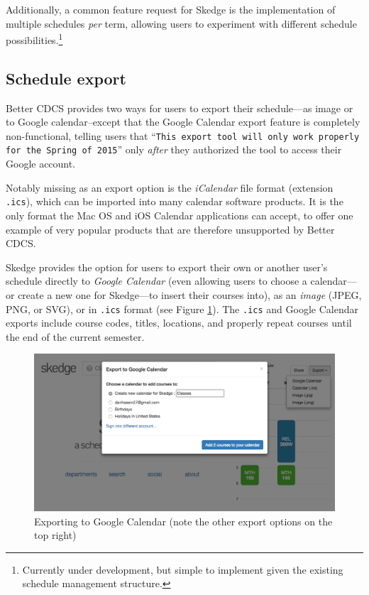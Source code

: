 Additionally, a common feature request for Skedge is the implementation of multiple schedules \emph{per} term, allowing users to experiment with different schedule possibilities.\footnote{Currently under development, but simple to implement given the existing schedule management structure.}

\subsection{Schedule export}

Better CDCS provides two ways for users to export their schedule---as image or to Google calendar--except that the Google Calendar export feature is completely non-functional, telling users that ``{\tt This export tool will only work properly for the Spring of 2015}'' only \emph{after} they authorized the tool to access their Google account.

Notably missing as an export option is the \emph{iCalendar} file format (extension {\tt .ics}), which can be imported into many calendar software products. It is the only format the Mac OS and iOS Calendar applications can accept, to offer one example of very popular products that are therefore unsupported by Better CDCS.

Skedge provides the option for users to export their own or another user's schedule directly to \emph{Google Calendar} (even allowing users to choose a calendar---or create a new one for Skedge---to insert their courses into), as an \emph{image} (JPEG, PNG, or SVG), or in {\tt .ics} format (see Figure \ref{fig:sk-export}). The {\tt .ics} and Google Calendar exports include course codes, titles, locations, and properly repeat courses until the end of the current semester.

\vspace{20pt}

\begin{figure}[ht]
  \centering
  \vspace{2pt}
  \includegraphics[width=14cm]{images/skedge/export}
  \caption{Exporting to Google Calendar (note the other export options on the top right)} \label{fig:sk-export}
\end{figure}

\clearpage